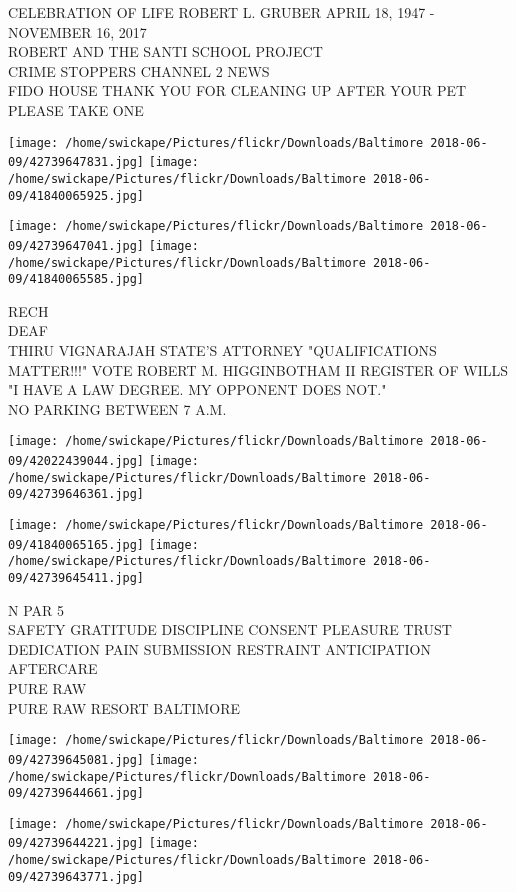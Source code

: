 \documentclass[10pt,letterpaper]{article}
\begin{document}
CELEBRATION OF LIFE ROBERT L. GRUBER APRIL 18, 1947 {-} NOVEMBER 16, 2017\\
ROBERT AND THE SANTI SCHOOL PROJECT\\
CRIME STOPPERS CHANNEL 2 NEWS\\
FIDO HOUSE THANK YOU FOR CLEANING UP AFTER YOUR PET PLEASE TAKE ONE
\pagebreak

\texttt{[image: /home/swickape/Pictures/flickr/Downloads/Baltimore 2018-06-09/42739647831.jpg]}
\texttt{[image: /home/swickape/Pictures/flickr/Downloads/Baltimore 2018-06-09/41840065925.jpg]}

\texttt{[image: /home/swickape/Pictures/flickr/Downloads/Baltimore 2018-06-09/42739647041.jpg]}
\texttt{[image: /home/swickape/Pictures/flickr/Downloads/Baltimore 2018-06-09/41840065585.jpg]}

RECH\\
DEAF\\
THIRU VIGNARAJAH STATE'S ATTORNEY "QUALIFICATIONS MATTER!!!" VOTE ROBERT M. HIGGINBOTHAM II REGISTER OF WILLS "I HAVE A LAW DEGREE.  MY OPPONENT DOES NOT."\\
NO PARKING BETWEEN 7 A.M.
\pagebreak

\texttt{[image: /home/swickape/Pictures/flickr/Downloads/Baltimore 2018-06-09/42022439044.jpg]}
\texttt{[image: /home/swickape/Pictures/flickr/Downloads/Baltimore 2018-06-09/42739646361.jpg]}

\texttt{[image: /home/swickape/Pictures/flickr/Downloads/Baltimore 2018-06-09/41840065165.jpg]}
\texttt{[image: /home/swickape/Pictures/flickr/Downloads/Baltimore 2018-06-09/42739645411.jpg]}

N PAR 5\\
SAFETY GRATITUDE DISCIPLINE CONSENT PLEASURE TRUST DEDICATION PAIN SUBMISSION RESTRAINT ANTICIPATION AFTERCARE\\
PURE RAW\\
PURE RAW RESORT BALTIMORE
\pagebreak

\texttt{[image: /home/swickape/Pictures/flickr/Downloads/Baltimore 2018-06-09/42739645081.jpg]}
\texttt{[image: /home/swickape/Pictures/flickr/Downloads/Baltimore 2018-06-09/42739644661.jpg]}

\texttt{[image: /home/swickape/Pictures/flickr/Downloads/Baltimore 2018-06-09/42739644221.jpg]}
\texttt{[image: /home/swickape/Pictures/flickr/Downloads/Baltimore 2018-06-09/42739643771.jpg]}
\end{document}
